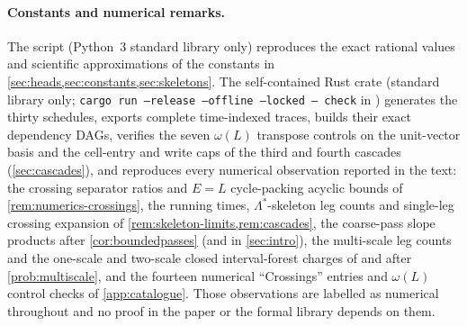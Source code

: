\paragraph{Constants and numerical remarks.} The script  (Python~3 standard library only)
reproduces the exact rational values and scientific approximations of the constants in \cref{sec:heads,sec:constants,sec:skeletons}.
The self-contained Rust crate  (standard library only; \texttt{cargo run --release --offline --locked -- check} in
) generates the thirty schedules, exports complete time-indexed traces, builds their exact dependency DAGs, verifies
the seven $\omega(L)$ transpose controls on the unit-vector basis and the cell-entry and write caps of the third and fourth cascades
(\cref{sec:cascades}), and reproduces every numerical observation reported in the text: the crossing separator ratios and $E=L$
cycle-packing acyclic bounds of \cref{rem:numerics-crossings}, the running times, $\Lambda^*$-skeleton leg counts and single-leg crossing
expansion of \cref{rem:skeleton-limits,rem:cascades}, the coarse-pass slope products after \cref{cor:boundedpasses} (and in
\cref{sec:intro}), the multi-scale leg counts and the one-scale and two-scale closed interval-forest charges of and after
\cref{prob:multiscale}, and the fourteen numerical ``Crossings'' entries and $\omega(L)$ control checks of \cref{app:catalogue}. Those
observations are labelled as numerical throughout and no proof in the paper or the formal library depends on them.
